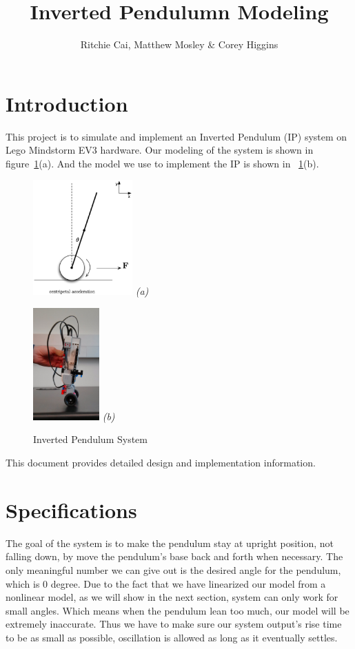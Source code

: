 \documentclass{notes}
\author{Ritchie Cai, Matthew Mosley \& Corey Higgins}
\title{Inverted Pendulumn Modeling}
\begin{document}
\maketitle 


\section{Introduction}
This project is to simulate and implement an Inverted Pendulum (IP) system on Lego Mindstorm EV3 hardware.
Our modeling of the system is shown in figure~\ref{fig:system_simulation}(a). And the model we use
to implement the IP is shown in ~\ref{fig:system_simulation}(b). 

\begin{figure}[h]
  \begin{center}
    \begin{minipage}[b]{1.5in}
      \mbox{\includegraphics[width=1.5in]{pics/Full_System_2.eps}}
      \mbox{\emph{(a)}}
    \end{minipage}
    \begin{minipage}[b]{1in}
      \mbox{\includegraphics[width=1in]{pics/Lego/Build_side2.eps}}
      \mbox{\emph{(b)}}
    \end{minipage}
  \end{center}
  \caption{Inverted Pendulum System}
  \label{fig:system_simulation}
\end{figure}
\FloatBarrier

This document provides detailed design and implementation information.

\section{Specifications}
The goal of the system is to make the pendulum stay at upright position, not falling down, by move
the pendulum's base back and forth when necessary. The only meaningful number we can give out is the
desired angle for the pendulum, which is 0 degree. Due to the fact that we have linearized our model from a
nonlinear model, as we will show in the next section, system can only work for small angles. 
Which means when the pendulum lean too much,
our model will be extremely inaccurate. Thus we have to make sure our system output's rise time
to be as small as possible, oscillation is allowed as long as it eventually settles.
\end{document}
